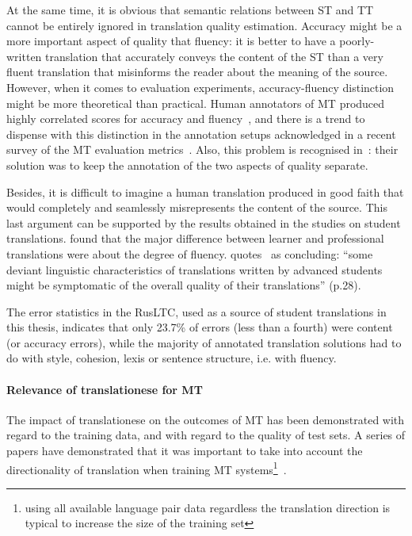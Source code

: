 At the same time, it is obvious that semantic relations between ST and TT cannot be entirely ignored in translation quality estimation. Accuracy might be a more important aspect of quality that fluency: it is better to have a poorly-written translation that accurately conveys the content of the ST than a very fluent translation that misinforms the reader about the meaning of the source. 
However, when it comes to evaluation experiments, accuracy-fluency distinction might be more theoretical than practical. Human annotators of MT produced highly correlated scores for accuracy and fluency~\cite{CallisonBurch2007}, and there is a trend to dispense with this distinction in the annotation setups acknowledged in a recent survey of the MT evaluation metrics~\cite{Chatzikoumi2020}. Also, this problem is recognised in~\citet{Daems2017}: their solution was to keep the annotation of the two aspects of quality separate.

Besides, it is difficult to imagine a human translation produced in good faith that would completely and seamlessly misrepresents the content of the source. This last argument can be supported by the results obtained in the studies on student translations. \citet{Carl2010} found that the major difference between learner and professional translations were about the degree of fluency. \citet{Sutter2017} quotes~\citet{Loock2016} as concluding: ``some deviant linguistic characteristics of translations written by advanced students might be symptomatic of the overall quality of their translations'' (p.28). 

The error statistics in the \gls{RusLTC}, used as a source of student translations in this thesis, indicates that only 23.7\% of errors (less than a fourth) were content (or accuracy errors), while the majority of annotated translation solutions had to do with style, cohesion, lexis or sentence structure, i.e. with fluency. 
\paragraph{Relevance of translationese for MT} The impact of translationese on the outcomes of MT has been demonstrated with regard to the training data, and with regard to the quality of test sets. 
A series of papers have demonstrated that it was important to take into account the directionality of translation when training MT systems\footnote{using all available language pair data regardless the translation direction is typical to increase the size of the training set}~\cite{Kurokawa2009,Lembersky2012,Lembersky2013,Stymne2017}.

